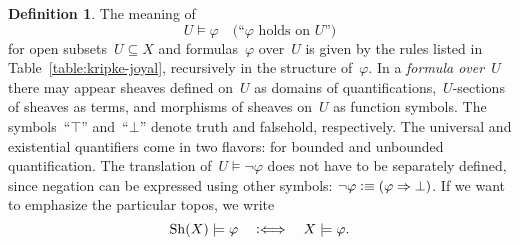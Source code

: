\documentclass[10pt]{amsart}
\theoremstyle{definition}
\newtheorem{defn}{Definition}[section]
\theoremstyle{plain}
\theoremstyle{remark}
\newcommand{\Sh}{\mathrm{Sh}}
\newcommand{\?}{\,{:}\,}
\renewcommand{\_}{\mathpunct{.}\,}
\newcommand{\Ll}{\vcentcolon\Longleftrightarrow}
\newcommand{\defequiv}{\vcentcolon\equiv}
\begin{document}
\begin{defn}The meaning of 
\[ U \models \varphi \quad\text{(``$\varphi$ holds on $U$'')} \]
for open subsets~$U \subseteq X$ and formulas~$\varphi$ over~$U$ is given by
the rules listed in Table~\ref{table:kripke-joyal}, recursively in the structure of~$\varphi$.
In a \emph{formula over~$U$} there may appear sheaves defined on~$U$ as domains
of quantifications,~$U$-sections of sheaves as terms, and morphisms of sheaves
on~$U$ as function symbols. The symbols~``$\top$'' and~``$\bot$'' denote truth
and falsehold, respectively. The universal and existential quantifiers come in
two flavors: for bounded and unbounded quantification.
The translation of~$U \models \neg\varphi$ does not have to be separately defined, since
negation can be expressed using other symbols: $\neg\varphi \defequiv (\varphi
\Rightarrow \bot)$. If we want to emphasize the particular topos, we write
\[ \Sh(X) \models \varphi \quad\Ll\quad X \models \varphi. \]
\end{defn}
\end{document}

